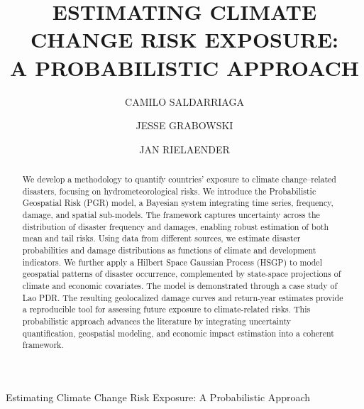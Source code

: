 \documentclass{ws-cce}
\begin{document}
         {Estimating Climate Change Risk Exposure: A Probabilistic Approach}

\catchline{}{}{}{}{}

\title{ESTIMATING CLIMATE CHANGE RISK EXPOSURE:\\ A PROBABILISTIC APPROACH}

\author{CAMILO SALDARRIAGA}
\address{ESCP Business School\\
juan\_camilo.saldarriaga@edu.escp.eu}

\author{JESSE GRABOWSKI}
\address{Paris-1 Panth\'{e}on-Sorbonne\\
jessegrabowski@gmail.com}

\author{JAN RIELAENDER}
\address{OECD Development Center\\
Jan.RIELAENDER@oecd.org}

\maketitle

\begin{history}
\end{history}

\begin{abstract}
We develop a methodology to quantify countries' exposure to climate change--related disasters, focusing on hydrometeorological risks. We introduce the Probabilistic Geospatial Risk (PGR) model, a Bayesian system integrating time series, frequency, damage, and spatial sub-models. The framework captures uncertainty across the distribution of disaster frequency and damages, enabling robust estimation of both mean and tail risks. Using data from different sources, we estimate disaster probabilities and damage distributions as functions of climate and development indicators. We further apply a Hilbert Space Gaussian Process (HSGP) to model geospatial patterns of disaster occurrence, complemented by state-space projections of climate and economic covariates. The model is demonstrated through a case study of Lao PDR. The resulting geolocalized damage curves and return-year estimates provide a reproducible tool for assessing future exposure to climate-related risks. This probabilistic approach advances the literature by integrating uncertainty quantification, geospatial modeling, and economic impact estimation into a coherent framework.
\end{abstract}
\end{document}
